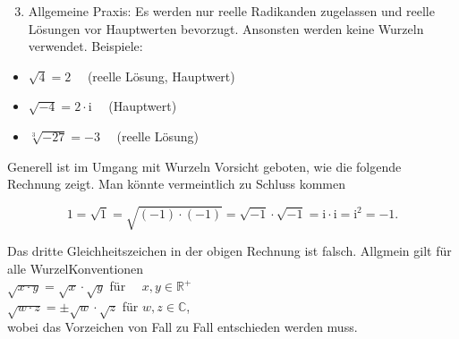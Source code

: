 \documentclass[10pt]{article}
\begin{document}
\begin{enumerate}
  \setcounter{enumi}{2}
  \item Allgemeine Praxis: Es werden nur reelle Radikanden zugelassen und reelle Lösungen vor Hauptwerten bevorzugt. Ansonsten werden keine Wurzeln verwendet. Beispiele:
\end{enumerate}

\begin{itemize}
  \item $\sqrt{4}=2 \quad$ (reelle Lösung, Hauptwert)
  \item $\sqrt{-4}=2 \cdot \mathrm{i} \quad$ (Hauptwert)
  \item $\sqrt[3]{-27}=-3 \quad$ (reelle Lösung)
\end{itemize}

Generell ist im Umgang mit Wurzeln Vorsicht geboten, wie die folgende Rechnung zeigt. Man könnte vermeintlich zu Schluss kommen


\begin{equation*}
1=\sqrt{1}=\sqrt{(-1) \cdot(-1)}=\sqrt{-1} \cdot \sqrt{-1}=\mathrm{i} \cdot \mathrm{i}=\mathrm{i}^{2}=-1 . \tag{5.47}
\end{equation*}


Das dritte Gleichheitszeichen in der obigen Rechnung ist falsch. Allgmein gilt für alle WurzelKonventionen\\
$\sqrt{x \cdot y}=\sqrt{x} \cdot \sqrt{y}$ für $\quad x, y \in \mathbb{R}^{+}$\\
$\sqrt{w \cdot z}= \pm \sqrt{w} \cdot \sqrt{z}$ für $w, z \in \mathbb{C}$,\\
wobei das Vorzeichen von Fall zu Fall entschieden werden muss.
\end{document}
